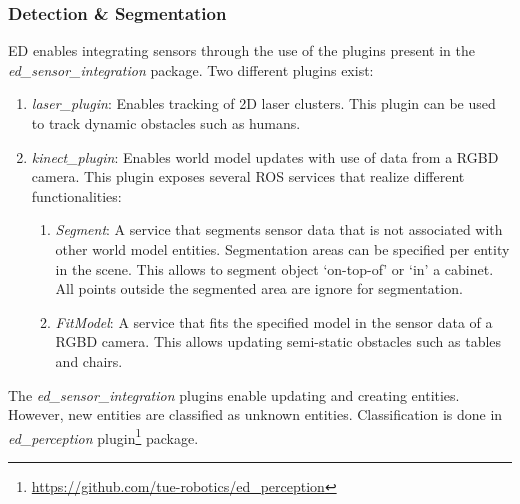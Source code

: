\subsubsection{Detection \& Segmentation}
ED enables integrating sensors through the use of the plugins present in the \textit{ed\_sensor\_integration} package.
Two different plugins exist:
\begin{enumerate}
\item \emph{laser\_plugin}: Enables tracking of 2D laser clusters. This plugin can be used to track dynamic obstacles such as humans.
\item \emph{kinect\_plugin}: Enables world model updates with use of data from a RGBD camera. This plugin exposes several ROS services that realize different functionalities:
\begin{enumerate}[label=(\alph*)]
\item \emph{Segment}: A service that segments sensor data that is not associated with other world model entities. Segmentation areas can be specified per entity in the scene. This allows to segment object `on-top-of’ or ‘in’ a cabinet. All points outside the segmented area are ignore for segmentation.
\item \emph{FitModel}: A service that fits the specified model in the sensor data of a RGBD camera. This allows updating semi-static obstacles such as tables and chairs.
\end{enumerate}
\end{enumerate}

The \emph{ed\_sensor\_integration} plugins enable updating and creating entities. However, new entities are classified as unknown entities. Classification is done in \emph{ed\_perception} plugin\footnote{\url{https://github.com/tue-robotics/ed_perception}} package. 